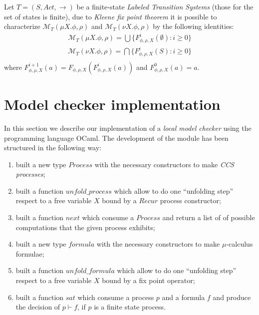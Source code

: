 Let $T = (S, Act, \rightarrow)$ be a finite-state \emph{Labeled
  Transition Systems} (those for the set of states is finite), due to
\emph{Kleene fix point theorem} it is possible to characterize $
\mathcal{M}_T(\mu X.\phi, \rho)$ and $ \mathcal{M}_T(\nu X.\phi,
\rho)$ by the following identities:
\begin{displaymath}
  \begin{split}
    \mathcal{M}_T(\mu X.\phi, \rho) = \bigcup \{F_{\phi, \rho,
      X}^i(\emptyset):i\geq 0\} \\
    \mathcal{M}_T(\nu X.\phi, \rho) = \bigcap \{F_{\phi, \rho,
      X}^i(S):i\geq 0\} \\
  \end{split}
\end{displaymath}
where $F_{\phi, \rho, X}^{i+1}(a) = F_{\phi, \rho, X}(F_{\phi, \rho,
  X}^i(a))$ and $F_{\phi, \rho, X}^0(a) = a$.

\section{Model checker implementation}

In this section we describe our implementation of a \emph{local model
  checker} using the programming language OCaml. The development of
the module has been structured in the following way:
\begin{enumerate}
\item built a new type $Process$ with the necessary constructors to
  make \emph{CCS processes};
\item built a function $unfold\_process$ which allow to do one
  ``unfolding step'' respect to a free variable $X$ bound by a $Recur$
  process constructor;
\item built a function $next$ which consume a $Process$ and return a
  list of of possible computations that the given process exhibits;
\item built a new type $formula$ with the necessary constructors to
  make $\mu$-calculus formulae;
\item built a function $unfold\_formula$ which allow to do one
  ``unfolding step'' respect to a free variable $X$ bound by a fix
  point operator;
\item built a function $sat$ which consume a process $p$ and a formula
  $f$ and produce the decision of $p \vdash f$, if $p$ is a finite
  state process.
\end{enumerate}

